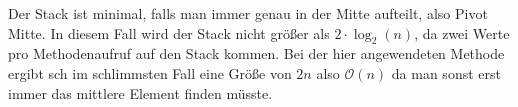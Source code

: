 \documentclass[a4paper,11pt]{article}             %
\begin{document}

Der Stack ist minimal, falls man immer genau in der Mitte aufteilt, also Pivot Mitte. In diesem Fall wird der Stack nicht größer als $2\cdot\log _2 (n)$, da zwei Werte pro Methodenaufruf auf den Stack kommen. Bei der hier angewendeten Methode ergibt sch im schlimmsten Fall eine Größe von $2n$ also $\mathcal{O}(n)$ da man sonst erst immer das mittlere Element finden müsste.
\end{document}

